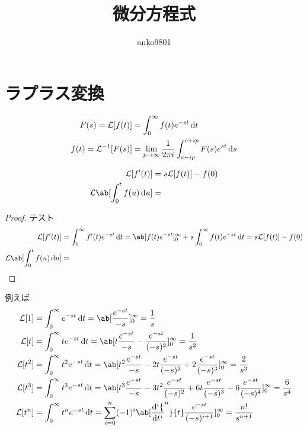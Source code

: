\documentclass[uplatex,diffipdfmx,a4paper,11pt]{jlreq}
\title{微分方程式}
\author{anko9801}
\newcommand{\LL}{\mathcal{L}}
\begin{document}
\maketitle
\tableofcontents
\clearpage


\section{ラプラス変換}
\begin{definition}[ラプラス変換]
  \begin{align}
    F(s) = \LL[f(t)]      & = \int_0^\infty f(t)e^{-st}\dl{t}                                     \\
    f(t) = \LL^{-1}[F(s)] & = \lim_{p\to\infty}\frac{1}{2\pi i}\int_{c-ip}^{c+ip}F(s)e^{st}\dl{s}
  \end{align}
\end{definition}
\begin{theorem}
  \begin{align}
    \LL[f'(t)]                 & = s\LL[f(t)] - f(0) \\
    \LL\ab[\int_0^tf(u)\dl{u}] & =
  \end{align}
\end{theorem}
\begin{proof}
  テスト
  \begin{align}
    \LL[f'(t)]                 & = \int_0^\infty f'(t)e^{-st}\dl{t} = \ab[f(t)e^{-st}]_0^\infty + s\int_0^\infty f(t)e^{-st}\dl{t} = s\LL[f(t)] - f(0) \\
    \LL\ab[\int_0^tf(u)\dl{u}] & =
  \end{align}
\end{proof}
例えば
\begin{align}
  \LL[1]   & = \int_0^\infty e^{-st}\dl{t} = \ab[\frac{e^{-st}}{-s}]_0^\infty = \frac{1}{s}                                                                                           \\
  \LL[t]   & = \int_0^\infty te^{-st}\dl{t} = \ab[t\frac{e^{-st}}{-s} - \frac{e^{-st}}{(-s)^2}]_0^\infty = \frac{1}{s^2}                                                              \\
  \LL[t^2] & = \int_0^\infty t^2e^{-st}\dl{t} = \ab[t^2\frac{e^{-st}}{-s} - 2t\frac{e^{-st}}{(-s)^2} + 2\frac{e^{-st}}{(-s)^3}]_0^\infty = \frac{2}{s^3}                              \\
  \LL[t^3] & = \int_0^\infty t^3e^{-st}\dl{t} = \ab[t^3\frac{e^{-st}}{-s} - 3t^2\frac{e^{-st}}{(-s)^2} + 6t\frac{e^{-st}}{(-s)^3} - 6\frac{e^{-st}}{(-s)^4}]_0^\infty = \frac{6}{s^4} \\
  \LL[t^n] & = \int_0^\infty t^ne^{-st}\dl{t} = \sum_{i = 0}^{n}(-1)^i\ab[\diff[i]{t^n}{t}\frac{e^{-st}}{(-s)^{i+1}}]_0^\infty = \frac{n!}{s^{n+1}}
\end{align}
\end{document}
